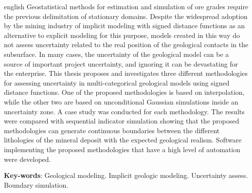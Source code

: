 \documentclass[
    oneside, %
	12pt,				%
	a4paper,			%
	chapter=TITLE,		%
	english,			%
	french,				%
	spanish,			%
	brazil				%
	]{abntex2}
\begin{document}
\begin{resumo}[Abstract]
 \begin{otherlanguage*}{english}
   Geostatistical methods for estimation and simulation of ore grades require the previous delimitation of stationary domains. Despite the widespread adoption by the mining industry of implicit modeling with signed distance functions as an alternative to explicit modeling for this purpose, models created in this way do not assess uncertainty related to the real position of the geological contacts in the subsurface. In many cases, the uncertainty of the geological model can be a source of important project uncertainty, and ignoring it can be devastating for the enterprise. This thesis proposes and investigates three different methodologies for assessing uncertainty in multi-categorical geological models using signed distance functions. One of the proposed methodologies is based on interpolation, while the other two are based on unconditional Gaussian simulations inside an uncertainty zone. A case study was conducted for each methodology. The results were compared with sequential indicator simulation showing that the proposed methodologies can generate continuous boundaries between the different lithologies of the mineral deposit with the expected geological realism. Software implementing the proposed methodologies that have a high level of automation were developed.

   \vspace{\onelineskip}
 
   \noindent 
   \textbf{Key-words}: Geological modeling. Implicit geologic modeling. Uncertainty assess. Boundary simulation.
 \end{otherlanguage*}
\end{resumo}


\listoffigures*
\cleardoublepage

\tableofcontents*
\cleardoublepage



\textual





\end{document}
